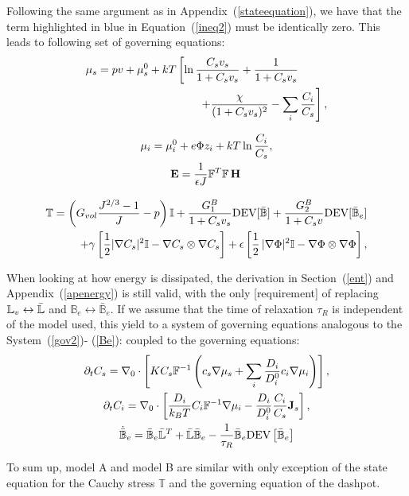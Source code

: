 Following the same argument as in Appendix~(\ref{stateequation}), we have that the term highlighted in blue in Equation~(\ref{ineq2}) must be identically zero. This leads to following set of governing equations:
\begin{gather}
\begin{aligned}
\mu_s = p v + \mu_s^0 + kT&\left[\ln \frac{C_s v_s}{1+C_s v_s} + \frac{1}{1+C_sv_s}\right.\\
&\left.\ \ \ \ \ \ +\frac{\chi}{(1+C_s v_s)^2}-\sum_i \frac{C_i}{C_s}\right], 
\end{aligned}\\[2.5mm]
\mu_i = \mu^0_i + e\Phi z_i + kT \ln \frac{C_i}{C_s},\\
\mathbf{E} = \frac{1}{\epsilon J} \mathbb{F}^T \mathbb{F}\, \mathbf{H}\, \\[3mm]
\begin{aligned}
\mathbb{T}= \left(G_{vol}\dfrac{J^{2/3}-1}{J}-p\right) \mathbb{I} + \frac{G^B_1}{1+C_sv_s}\text{DEV}[\bar{\mathbb{B}}] + \frac{G^B_2}{1+C_sv}\text{DEV}[\bar{\mathbb{B}}_e]\\
+ \gamma \left[\frac{1}{2} |\nabla C_s|^2\mathbb{I} - \nabla C_s \otimes \nabla C_s\right]+ \epsilon \left[\frac{1}{2} \,|\nabla \Phi|^2\mathbb{I} -\nabla \Phi \otimes \nabla \Phi\right],\label{sys2B}
\end{aligned}
\end{gather}

When looking at how energy is dissipated, the derivation in Section~(\ref{ent}) and Appendix~(\ref{apenergy}) is still valid, with the only [requirement] of replacing $\mathbb{L}_v\leftrightarrow \bar{\mathbb{L}}$ and $\mathbb{B}_e\leftrightarrow\mathbb{\bar{B}}_e$. If we assume that the time of relaxation $\tau_R$ is independent of the model used, this yield to a system of governing equations analogous to the System~(\ref{gov2})- (\ref{Be}):
coupled to the governing equations:
\begin{gather}
\partial_t C_s=\nabla_0 \cdot\left[K C_s \mathbb{F}^{-1}\left(c_s\nabla \mu_s +\sum_i \frac{D_i}{D^0_i} c_i \nabla \mu_i\right)\right],\\
\partial_t C_i= \nabla_0\cdot\left[\frac{D_i}{k_B T}C_i\mathbb{F}^{-1}\nabla \mu_i -\frac{D_i}{D^0_i} \frac{C_i}{C_s} \mathbf{J}_s\right],\\
\dot{\bar{\mathbb{B}}}_e = \bar{\mathbb{B}}_e \bar{\mathbb{L}}^T +\bar{\mathbb{L}} \bar{\mathbb{B}}_e -\frac{1}{\tau_R} \bar{\mathbb{B}}_e \text{DEV}\left[\bar{\mathbb{B}}_e\right]\label{BeB}
\end{gather}

To sum up, model A and model B are similar with only exception of the state equation for the Cauchy stress $\mathbb{T}$ and the governing equation of the dashpot.
